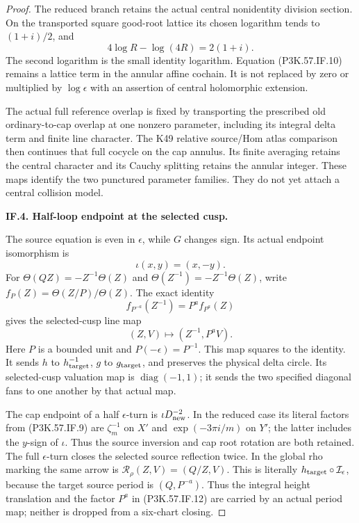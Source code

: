 \begin{proof}
The reduced branch retains the actual central nonidentity division section.
On the transported square good-root lattice its chosen logarithm tends to
\((1+i)/2\), and
\[
                   4\log R-\log(4R)=2(1+i).             \tag{P3K.57.IF.10}
\]
The second logarithm is the small identity logarithm. Equation (P3K.57.IF.10)
remains a lattice term in the annular affine cochain. It is not replaced by
zero or multiplied by \(\log\epsilon\) with an assertion of central
holomorphic extension.

The actual full reference overlap is fixed by transporting the prescribed
old ordinary-to-cap overlap at one nonzero parameter, including its integral
delta term and finite line character. The K49 relative source/Hom atlas
comparison then continues that full cocycle on the cap annulus. Its finite
averaging retains the central character and its Cauchy splitting retains the
annular integer. These maps identify the two punctured parameter families.
They do not yet attach a central collision model.

\par\medskip\noindent\textbf{IF.4. Half-loop endpoint at the selected cusp.}\par\nopagebreak[4]

The source equation is even in \(\epsilon\), while \(G\) changes sign. Its
actual endpoint isomorphism is
\[
                  \iota(x,y)=(x,-y).                    \tag{P3K.57.IF.11}
\]
For \(\Theta(QZ)=-Z^{-1}\Theta(Z)\) and
\(\Theta(Z^{-1})=-Z^{-1}\Theta(Z)\), write
\(f_P(Z)=\Theta(Z/P)/\Theta(Z)\). The exact identity
\[
 f_{P^{-a}}(Z^{-1})=P^a f_{P^a}(Z)
\]
gives the selected-cusp line map
\[
                  (Z,V)\longmapsto(Z^{-1},P^a V).       \tag{P3K.57.IF.12}
\]
Here \(P\) is a bounded unit and \(P(-\epsilon)=P^{-1}\). This map squares
to the identity. It sends \(h\) to \(h_{\rm target}^{-1}\), \(g\) to
\(g_{\rm target}\), and preserves the physical delta circle.
Its selected-cusp valuation map is \(\operatorname{diag}(-1,1)\); it sends
the two specified diagonal fans to one another by that actual map.

The cap endpoint of a half \(\epsilon\)-turn is
\(\iota D_{\rm new}^{-2}\). In the reduced case its literal factors from
(P3K.57.IF.9) are \(\zeta_m^{-1}\) on \(X'\) and
\(\exp(-3\pi i/m)\) on \(Y'\); the latter includes the \(y\)-sign of
\(\iota\). Thus the source inversion and cap root rotation are both retained.
The full \(\epsilon\)-turn closes the selected source reflection twice.
In the global rho marking the same arrow is
\(\mathcal R_\rho(Z,V)=(Q/Z,V)\). This is literally
\(h_{\rm target}\circ\mathcal I_\epsilon\), because the target
source period is \((Q,P^{-a})\). Thus the integral height
translation and the factor \(P^a\) in (P3K.57.IF.12) are carried by an
actual period map; neither is dropped from a six-chart closing.


\end{proof}
